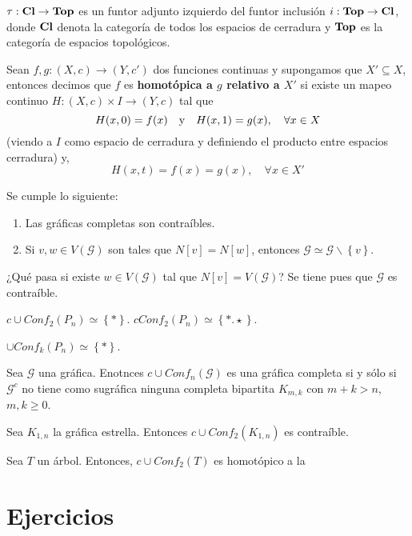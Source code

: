 \documentclass[12pt]{report}
\theoremstyle{largebreak}
\newcommand\cf[3]{\ensuremath{#1:#2\rightarrow#3}}
\begin{document}
    \begin{propo}
        $\cf{\tau}{\textup{\textbf{Cl}}}{\textup{\textbf{Top}}}$ es un funtor adjunto izquierdo del funtor inclusión $\cf{i}{\textup{\textbf{Top}}}{\textup{\textbf{Cl}}}$, donde $\textup{\textbf{Cl}}$ denota la categoría de todos los espacios de cerradura y $\textup{\textbf{Top}}$ es la categoría de espacios topológicos.
    \end{propo}

    \begin{mydef}
        Sean $\cf{f,g}{(X,c)}{(Y,c')}$ dos funciones continuas y supongamos que $X'\subseteq X$, entonces decimos que $f$ es \textbf{homotópica a $g$ relativo a $X'$} si existe un mapeo continuo $\cf{H}{(X,c)\times I}{(Y,c)}$ tal que
        \begin{equation*}
            H(x,0)=f(x)\quad\textup{y}\quad H(x,1)=g(x),\quad\forall x\in X
        \end{equation*}
        (viendo a $I$ como espacio de cerradura y definiendo el producto entre espacios cerradura) y,
        \begin{equation*}
            H(x,t)=f(x)=g(x),\quad\forall x\in X'
        \end{equation*}
    \end{mydef}

    \begin{obs}
        Se cumple lo siguiente:
        \begin{enumerate}
            \item Las gráficas completas son contraíbles.
            \item Si $v,w\in V(\mathcal{G})$ son tales que $N[v]=N[w]$, entonces $\mathcal{G}\simeq \mathcal{G}\backslash\left\{v\right\}$.
        \end{enumerate}
    \end{obs}

    ¿Qué pasa si existe $w\in V(\mathcal{G})$ tal que $N[v]=V(\mathcal{G})$? Se tiene pues que $\mathcal{G}$ es contraíble.

    \begin{theor}
        $c\cup Conf_2(P_n)\simeq\left\{*\right\}$.
        $cConf_2(P_n)\simeq\left\{*.\star\right\}$.
    \end{theor}

    \begin{theor}
        $\cup Conf_k(P_n)\simeq\left\{*\right\}$.
    \end{theor}

    \begin{theor}
        Sea $\mathcal{G}$ una gráfica. Enotnces $c\cup Conf_n(\mathcal{G})$ es una gráfica completa si y sólo si $\mathcal{G}^c$ no tiene como sugráfica ninguna completa bipartita $K_{ m,k}$ con $m+k>n$, $m,k\geq0$.
    \end{theor}

    \begin{theor}
        Sea $K_{ 1,n}$ la gráfica estrella. Entonces $c\cup Conf_2(K_{ 1,n})$ es contraíble.
    \end{theor}

    Sea $T$ un árbol. Entonces, $c\cup Conf_2(T)$ es homotópico a la 

    \chapter{Ejercicios}
\end{document}
